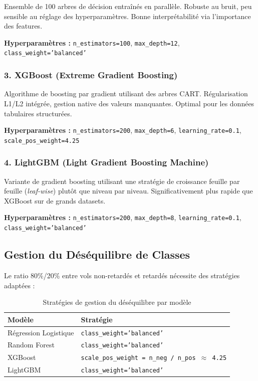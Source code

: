 \documentclass[12pt,a4paper]{article}
\begin{document}
Ensemble de 100 arbres de décision entraînés en parallèle. 
Robuste au bruit, peu sensible au réglage des hyperparamètres.
Bonne interprétabilité via l'importance des features.

\textbf{Hyperparamètres :} \texttt{n\_estimators=100}, \texttt{max\_depth=12}, 
\texttt{class\_weight='balanced'}

\subsubsection{3. XGBoost (Extreme Gradient Boosting)}

Algorithme de boosting par gradient utilisant des arbres CART. 
Régularisation L1/L2 intégrée, gestion native des valeurs manquantes.
Optimal pour les données tabulaires structurées.

\textbf{Hyperparamètres :} \texttt{n\_estimators=200}, \texttt{max\_depth=6}, 
\texttt{learning\_rate=0.1}, \texttt{scale\_pos\_weight=4.25}

\subsubsection{4. LightGBM (Light Gradient Boosting Machine)}

Variante de gradient boosting utilisant une stratégie de croissance feuille 
par feuille (\textit{leaf-wise}) plutôt que niveau par niveau. 
Significativement plus rapide que XGBoost sur de grands datasets.

\textbf{Hyperparamètres :} \texttt{n\_estimators=200}, \texttt{max\_depth=8}, 
\texttt{learning\_rate=0.1}, \texttt{class\_weight='balanced'}

\subsection{Gestion du Déséquilibre de Classes}

Le ratio 80\%/20\% entre vols non-retardés et retardés nécessite des stratégies adaptées :

\begin{table}[H]
  \centering
  \caption{Stratégies de gestion du déséquilibre par modèle}
  \begin{tabular}{ll}
    \toprule
    \textbf{Modèle} & \textbf{Stratégie} \\
    \midrule
    Régression Logistique & \texttt{class\_weight='balanced'} \\
    Random Forest & \texttt{class\_weight='balanced'} \\
    XGBoost & \texttt{scale\_pos\_weight = n\_neg / n\_pos $\approx$ 4.25} \\
    LightGBM & \texttt{class\_weight='balanced'} \\
    \bottomrule
  \end{tabular}
\end{table}
\end{document}
